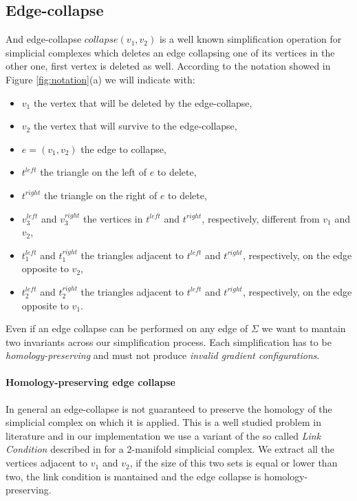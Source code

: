 \documentclass[preprint,5p,times,onecolumn]{article}
\begin{document}
\subsection{Edge-collapse}
And edge-collapse $collapse(v_1,v_2)$ is a well known simplification operation for simplicial complexes which deletes an edge collapsing one of its vertices in the other one, first vertex is deleted as well.
According to the notation showed in Figure \ref{fig:notation}(a) we will indicate with:

\begin{itemize}
	\item $v_1$ the vertex that will be deleted by the edge-collapse,
	\item $v_2$ the vertex that will survive to the edge-collapse,
	\item $e = (v_1,v_2)$ the edge to collapse,
	\item $t^{left}$ the triangle on the left of $e$ to delete,
	\item $t^{right}$ the triangle on the right of $e$ to delete,
	\item $v_3^{left}$ and $v_3^{right}$ the vertices in $t^{left}$ and $t^{right}$, respectively, different from $v_1$ and $v_2$,
	\item $t_1^{left}$ and $t_1^{right}$ the triangles adjacent to $t^{left}$ and $t^{right}$, respectively, on the edge opposite to $v_2$,
	\item $t_2^{left}$ and $t_2^{right}$ the triangles adjacent to $t^{left}$ and $t^{right}$, respectively, on the edge opposite to $v_1$. 
\end{itemize}

Even if an edge collapse can be performed on any edge of $\Sigma$ we want to mantain two invariants across our simplification process.
Each simplification has to be {\em homology-preserving} and must not produce {\em invalid gradient configurations}.

\paragraph{Homology-preserving edge collapse}
In general an edge-collapse is not guaranteed to preserve the homology of the simplicial complex on which it is applied. This is a well studied problem in literature \cite{Dey13} and in our implementation we use a variant of the so called {\em Link Condition} described in \cite{Dey13} for a 2-manifold simplicial complex. We extract all the vertices adjacent to $v_1$ and $v_2$, if the size of this two sets is equal or lower than two, the link condition is mantained and the edge collapse is homology-preserving.
\end{document}
